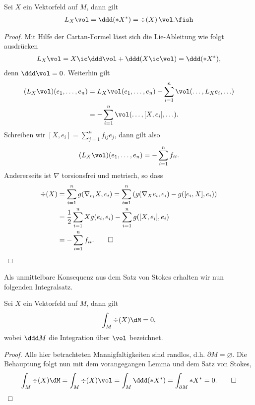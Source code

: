 \documentclass[%
	paper=a5,%
	fleqn,%
	DIV=18,%
	BCOR=0mm,
	fontsize=11pt,
	titlepage=false,%
	bibliography=totoc,
	DIV=18,%
	twoside=true,
	pdftitle=Riemannsche Geometrie,
	pdfauthor=Uwe Semmelmann,
	numbers=noendperiod]%
	{scrbook}
\begin{document}
\begin{prop}
Sei $X$ ein Vektorfeld auf $M$, dann gilt
\begin{align*}
L_{X}\vol = \ddd(*X^*) = \div(X)\,\vol.\fish
\end{align*}
\end{prop}
\begin{proof}
Mit Hilfe der Cartan-Formel lässt sich die Lie-Ableitung wie folgt ausdrücken
\begin{align*}
L_{X}\vol = X\ic \ddd\vol + \ddd(X\ic \vol) = \ddd(*X^*),
\end{align*}
denn $\ddd\vol = 0$. Weiterhin gilt
\begin{align*}
(L_{X}\vol)(e_{1},\ldots,e_{n}) &= L_{X}\vol(e_{1},\ldots,e_{n}) - \sum_{i=1}^n \vol(\ldots,L_{X}e_{i},\ldots)\\
&=- \sum_{i=1}^n\vol(\ldots,[X,e_{i}],\ldots).
\end{align*}
Schreiben wir $[X,e_{i}] = \sum_{j=1}^n f_{ij} e_{j}$, dann gilt also
\begin{align*}
(L_{X}\vol)(e_{1},\ldots,e_{n}) = - \sum_{i=1}^nf_{ii}.
\end{align*}
Andererseits ist $\nabla$ torsionsfrei und metrisch, so dass
\begin{align*}
\div(X) &= \sum_{i=1}^n g(\nabla_{e_{i}}X,e_{i}) = 
\sum_{i=1}^n \left(g(\nabla_{X}e_{i},e_{i}) -  g([e_{i},X],e_{i})\right)\\
&= \frac{1}{2}  \sum_{i=1}^n Xg(e_{i},e_{i})  - \sum_{i=1}^n g([X,e_{i}],e_{i})\\
&= -\sum_{i=1}^n f_{ii}.\qed
\end{align*}
\end{proof}

Als unmittelbare Konsequenz aus dem Satz von Stokes erhalten wir nun folgenden Integralsatz.

\begin{prop}
Sei $X$ ein Vektorfeld auf $M$, dann gilt
\begin{align*}
\int_{M}\div (X)\dM = 0,
\end{align*}
wobei $\ddd M$ die Integration über $\vol$ bezeichnet.\fish
\end{prop}
\begin{proof}
Alle hier betrachteten Mannigfaltigkeiten sind randlos, d.h. $\partial M  =\varnothing$. Die Behauptung folgt nun mit dem vorangegangen Lemma und dem Satz von Stokes,
\begin{align*}
\int_{M}\div(X)\dM = \int_{M}\div(X)\vol = \int_{M}\ddd(*X^*) = \int_{\partial M} *X^* = 0.\qed
\end{align*}
\end{proof}
\end{document}
